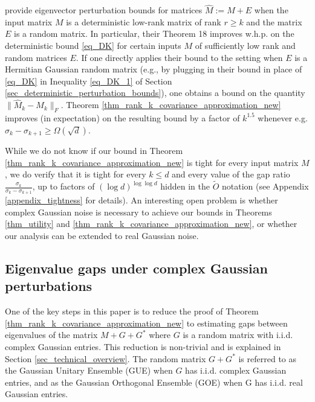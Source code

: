\documentclass[11pt,letterpaper]{article}
\begin{document}
\cite{o2018random} provide eigenvector perturbation bounds for matrices $\hat{M} := M+E$ when the input matrix $M$ is a deterministic low-rank matrix of rank $r \geq k$ and the matrix $E$ is a random matrix.
%
In particular, their Theorem 18 improves w.h.p. on the deterministic bound \eqref{eq_DK} for certain inputs $M$ of sufficiently low rank and random matrices $E$. 
%
If one directly applies their bound to the setting when $E$ is a Hermitian Gaussian random matrix (e.g., by plugging in their bound in place of  \eqref{eq_DK} in Inequality \eqref{eq_DK_1} of Section \ref{sec_deterministic_perturbation_bounds}), one obtains a bound on the quantity $\|\hat{M}_k - M_k\|_F$.
%
Theorem \ref{thm_rank_k_covariance_approximation_new} improves (in expectation) on the resulting bound by a factor of $k^{1.5}$ whenever e.g. $\sigma_{k}-\sigma_{k+1} \geq \Omega(\sqrt{d})$.

While we do not know if our bound in Theorem  \ref{thm_rank_k_covariance_approximation_new} is tight for every input matrix $M$, we do verify that it is tight for every $k \leq d$ and every value of the gap ratio $\frac{\sigma_k}{ \sigma_k- \sigma_{k+1}}$, up to factors of $(\log d)^{\log \log d}$ hidden in the $\tilde{O}$ notation (see Appendix \ref{appendix_tightness} for details).
%
An interesting open problem is whether complex Gaussian noise is necessary to achieve our bounds in Theorems \ref{thm_utility} and \ref{thm_rank_k_covariance_approximation_new}, or whether our analysis can be extended to real Gaussian noise.

\subsection{Eigenvalue gaps under complex Gaussian perturbations }\label{sec_technical_results}
One of the key steps in this paper is to reduce the proof of Theorem \ref{thm_rank_k_covariance_approximation_new} to estimating gaps between eigenvalues of the matrix $M+G+G^*$ where $G$ is a random matrix with i.i.d. complex Gaussian entries.
%
This reduction is non-trivial and is explained in Section \ref{sec_technical_overview}.
%
The random matrix $G+G^\ast$ is referred to as the Gaussian Unitary Ensemble (GUE) when $G$ has i.i.d. complex Gaussian entries, and as the Gaussian Orthogonal Ensemble (GOE) when G has i.i.d. real Gaussian entries.
\end{document}
